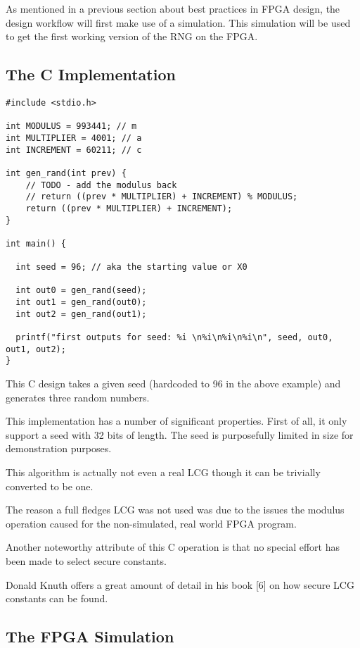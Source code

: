 \documentclass{article}
\begin{document}
    As mentioned in a previous section about best practices in FPGA design,
    the design workflow will first make use of a simulation.
    This simulation will be used to get the first working version of the RNG
    on the FPGA.

    \break

    \subsection{The C Implementation}

    \lstset{language=C}

    \begin{lstlisting}
#include <stdio.h>

int MODULUS = 993441; // m
int MULTIPLIER = 4001; // a
int INCREMENT = 60211; // c

int gen_rand(int prev) {
    // TODO - add the modulus back
    // return ((prev * MULTIPLIER) + INCREMENT) % MODULUS;
    return ((prev * MULTIPLIER) + INCREMENT);
}

int main() {

  int seed = 96; // aka the starting value or X0

  int out0 = gen_rand(seed);
  int out1 = gen_rand(out0);
  int out2 = gen_rand(out1);

  printf("first outputs for seed: %i \n%i\n%i\n%i\n", seed, out0, out1, out2);
}
    \end{lstlisting}

    This C design takes a given seed (hardcoded to 96 in the above example)
    and generates three random numbers.

    This implementation has a number of significant properties.
    First of all, it only support a seed with 32 bits of length.
    The seed is purposefully limited in size for demonstration purposes.

    This algorithm is actually not even a real LCG though it can
    be trivially converted to be one.

    The reason a full fledges LCG was not used was due
    to the issues the modulus operation caused for the non-simulated,
    real world FPGA program.

    Another noteworthy attribute of this C operation is
    that no special effort has been made to select secure constants.

    Donald Knuth offers a great amount of detail in his book [6] on
    how secure LCG constants can be found.

    \subsection{The FPGA Simulation}
\end{document}

